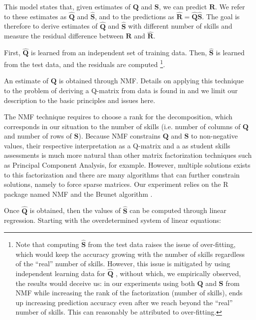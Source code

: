 This model states that, given estimates of $\mathbf{Q}$ and $\mathbf{S}$, we can predict $\mathbf{R}$. We refer to these estimates as $\hat{\mathbf{Q}}$ and $\hat{\mathbf{S}}$, and to the predictions as $\hat{\mathbf{R}}=\hat{\mathbf{Q}}\hat{\mathbf{S}}$. The goal is therefore to derive estimates of $\hat{\mathbf{Q}}$ and $\hat{\mathbf{S}}$ with different number of skills and measure the residual difference between $\mathbf{R}$ and $\hat{\mathbf{R}}$. 

First, $\hat{\mathbf{Q}}$ is learned from an independent set of training data. Then, $\hat{\mathbf{S}}$ is learned from the test data, and the residuals are computed%
\footnote{Note that computing $\hat{\mathbf{S}}$ from the test data raises the issue of over-fitting, which would keep the accuracy growing with the number of skills regardless of the \textquotedblleft{}real\textquotedblright{} number of skills. However, this issue is mitigated by using independent learning data for $\hat{\mathbf{Q}}$ , without which, we empirically observed, the results would deceive us: in our experiments using both $\mathbf{Q}$ and $\mathbf{S}$ from NMF while increasing the rank of the factorization (number of skills), ends up increasing prediction accuracy even after we reach beyond the \textquotedblleft{}real\textquotedblright{} number of skills. This can reasonably be attributed to over-fitting. %
}.

An estimate of $\hat{\mathbf{Q}}$ is obtained through NMF. Details on applying this technique to the problem of deriving a Q-matrix from data is found in \citep{desmarais2011conditions} and we limit our description to the basic principles and issues here.

The NMF technique requires to choose a rank for the decomposition, which corresponds in our situation to the number of skills (i.e. number of columns of $\mathbf{Q}$ and number of rows of $\mathbf{S}$). Because NMF constrains $\mathbf{Q}$ and $\mathbf{S}$ to non-negative values, their respective interpretation as a Q-matrix and a as student skills assessments is much more natural than other matrix factorization techniques such as Principal Component Analysis, for example. However, multiple solutions exists to this factorization and there are many algorithms that can further constrain solutions, namely to force sparse matrices. Our experiment relies on the R package named NMF and the Brunet algorithm \citep{Gaujoux2010}.

Once $\hat{\mathbf{Q}}$ is obtained, then the values of $\hat{\mathbf{S}}$ can be computed through linear regression. Starting with the overdetermined system of linear equations:

